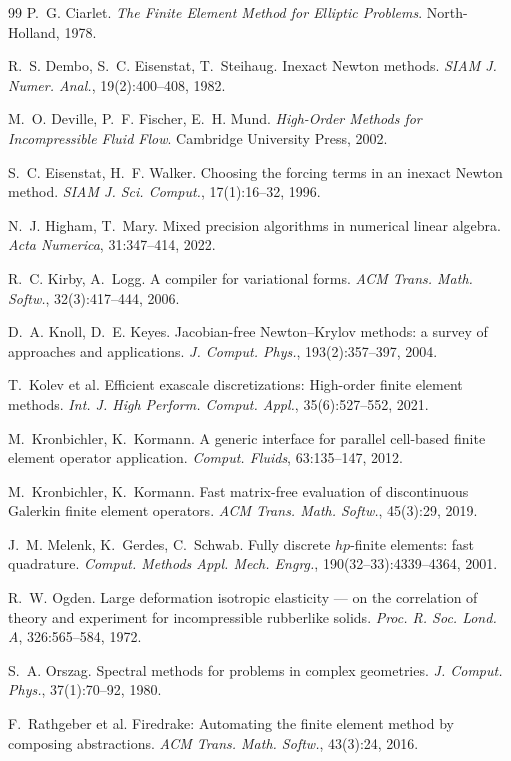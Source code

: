 \documentclass[11pt]{article}
\begin{document}
\begin{thebibliography}{99}
P.~G. Ciarlet.
\newblock \emph{The Finite Element Method for Elliptic Problems}.
\newblock North-Holland, 1978.

R.~S. Dembo, S.~C. Eisenstat, T.~Steihaug.
\newblock Inexact Newton methods.
\newblock \emph{SIAM J. Numer. Anal.}, 19(2):400--408, 1982.

M.~O. Deville, P.~F. Fischer, E.~H. Mund.
\newblock \emph{High-Order Methods for Incompressible Fluid Flow}.
\newblock Cambridge University Press, 2002.

S.~C. Eisenstat, H.~F. Walker.
\newblock Choosing the forcing terms in an inexact Newton method.
\newblock \emph{SIAM J. Sci. Comput.}, 17(1):16--32, 1996.

N.~J. Higham, T.~Mary.
\newblock Mixed precision algorithms in numerical linear algebra.
\newblock \emph{Acta Numerica}, 31:347--414, 2022.

R.~C. Kirby, A.~Logg.
\newblock A compiler for variational forms.
\newblock \emph{ACM Trans. Math. Softw.}, 32(3):417--444, 2006.

D.~A. Knoll, D.~E. Keyes.
\newblock Jacobian-free Newton--Krylov methods: a survey of approaches and applications.
\newblock \emph{J. Comput. Phys.}, 193(2):357--397, 2004.

T.~Kolev et al.
\newblock Efficient exascale discretizations: High-order finite element methods.
\newblock \emph{Int. J. High Perform. Comput. Appl.}, 35(6):527--552, 2021.

M.~Kronbichler, K.~Kormann.
\newblock A generic interface for parallel cell-based finite element operator application.
\newblock \emph{Comput. Fluids}, 63:135--147, 2012.

M.~Kronbichler, K.~Kormann.
\newblock Fast matrix-free evaluation of discontinuous Galerkin finite element operators.
\newblock \emph{ACM Trans. Math. Softw.}, 45(3):29, 2019.

J.~M. Melenk, K.~Gerdes, C.~Schwab.
\newblock Fully discrete $hp$-finite elements: fast quadrature.
\newblock \emph{Comput. Methods Appl. Mech. Engrg.}, 190(32--33):4339--4364, 2001.

R.~W. Ogden.
\newblock Large deformation isotropic elasticity --- on the correlation of theory and experiment for incompressible rubberlike solids.
\newblock \emph{Proc. R. Soc. Lond. A}, 326:565--584, 1972.

S.~A. Orszag.
\newblock Spectral methods for problems in complex geometries.
\newblock \emph{J. Comput. Phys.}, 37(1):70--92, 1980.

F.~Rathgeber et al.
\newblock Firedrake: Automating the finite element method by composing abstractions.
\newblock \emph{ACM Trans. Math. Softw.}, 43(3):24, 2016.

\end{thebibliography}
\end{document}

